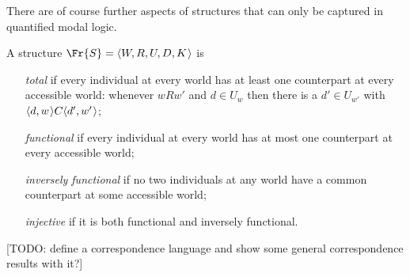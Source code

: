 \documentclass[11pt]{woarticle}
\theoremstyle{break}
\theoremstyle{nonumberplain}
\newcommand{\1}{\;\,|\;\,}
\renewcommand{\t}[1]{\ensuremath{\langle #1  \makebox[.2ex]{}\rangle}}
\begin{document}



There are of course further aspects of structures that can only be
captured in quantified modal logic.

\begin{definition}
  A structure $\Fr{S} = \t{W,R,U,D,K}$ is
  \begin{itemize}
  \item[\textnormal{\emph{total}}] if every individual at every world
    has at least one counterpart at every accessible world: whenever
    $wRw'$ and $d\in U_w$ then there is a $d' \in U_{w'}$ with
    $\t{d,w}C\t{d',w'}$;
  \item[\textnormal{\emph{functional}}] if every individual at every
    world has at most one counterpart at every accessible world;
  \item[\textnormal{\emph{inversely functional}}] if no two
    individuals at any world have a common counterpart at some
    accessible world;
  \item[\textnormal{\emph{injective}}] if it is both functional and
    inversely functional.
  \end{itemize}
\end{definition}

[TODO: define a correspondence language and show some general correspondence
results with it?]
\end{document}
